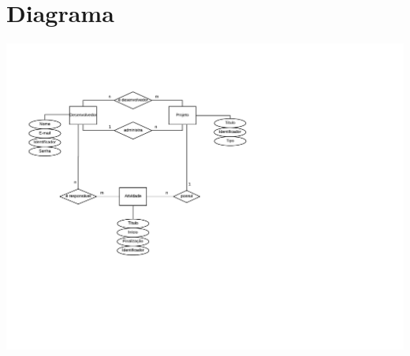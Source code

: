 \documentclass{article}
\begin{document}
\section{Diagrama}
\includegraphics[width=\paperwidth]{diagrama/diagrama.png}
\end{document}
